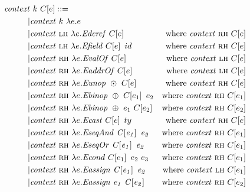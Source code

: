 \documentclass[acmsmall,review,anonymous]{acmart}\settopmatter{printfolios=true,printccs=false,printacmref=false}
\begin{document}
\[\begin{aligned}
\mathit{context} & ~ k ~ \ctx{\expr} ::= \\
| & \mathit{context} ~ k ~ \lambda \expr.\expr & \\ %
| & \mathit{context} ~ \lh ~ \lambda \expr.\deref{\ctx{\expr}} &
\textnormal{where } \mathit{context} ~  \rh ~ \ctx{\expr} \\ %
| & \mathit{context} ~ \lh ~ \lambda \expr.\field{\ctx{\expr}}{id} &
\textnormal{where } \mathit{context} ~  \rh ~ \ctx{\expr} \\ %
| & \mathit{context} ~ \rh ~ \lambda \expr.\valof{\ctx{\expr}} &
\textnormal{where } \mathit{context} ~  \lh ~ \ctx{\expr} \\ %
| & \mathit{context} ~ \rh ~ \lambda \expr.\addrof{\ctx{\expr}} & \textnormal{where } \mathit{context} ~  \lh ~ \ctx{\expr} \\ %
| & \mathit{context} ~ \rh ~ \lambda \expr.\unop{\odot}{\ctx{\expr}} & \textnormal{where } \mathit{context} ~  \rh ~ \ctx{\expr} \\ %
| & \mathit{context} ~ \rh ~ \lambda \expr.\binop{\oplus}{\ctx{\expr_1}}{\expr_2} & \textnormal{where } \mathit{context} ~  \rh ~ \ctx{\expr_1} \\ %
| & \mathit{context} ~ \rh ~ \lambda \expr.\binop{\oplus}{\expr_1}{\ctx{\expr_2}} & \textnormal{where } \mathit{context} ~  \rh ~ \ctx{\expr_2} \\ %
| & \mathit{context} ~ \rh ~ \lambda \expr.\cast{\ctx{\expr}}{\type} & \textnormal{where } \mathit{context} ~  \rh ~ \ctx{\expr} \\ %
| & \mathit{context} ~ \rh ~ \lambda \expr.\seqand{\ctx{\expr_1}}{\expr_2} & \textnormal{where } \mathit{context} ~  \rh ~ \ctx{\expr_1} \\ %
| & \mathit{context} ~ \rh ~ \lambda \expr.\seqor{\ctx{\expr_1}}{\expr_2} & \textnormal{where } \mathit{context} ~  \rh ~ \ctx{\expr_1} \\ %
| & \mathit{context} ~ \rh ~ \lambda \expr.\condition{\ctx{\expr_1}}{\expr_2}{\expr_3} & \textnormal{where } \mathit{context} ~  \rh ~ \ctx{\expr_1} \\ %
| & \mathit{context} ~ \rh ~ \lambda \expr.\assign{\ctx{\expr_1}}{\expr_2} & \textnormal{where } \mathit{context} ~  \lh ~ \ctx{\expr_1} \\ %
| & \mathit{context} ~ \rh ~ \lambda \expr.\assign{\expr_1}{\ctx{\expr_2}} & \textnormal{where } \mathit{context} ~  \rh ~ \ctx{\expr_2} \\ %

\end{aligned}\]
\end{document}
